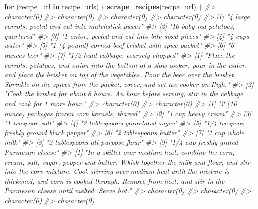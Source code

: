 \documentclass[
  12pt,
]{book}
\newenvironment{Shaded}{\begin{snugshade}}{\end{snugshade}}
\newcommand{\CommentTok}[1]{\textcolor[rgb]{0.37,0.37,0.37}{\textit{#1}}}
\newcommand{\ControlFlowTok}[1]{\textcolor[rgb]{0.27,0.27,0.27}{\textbf{#1}}}
\newcommand{\KeywordTok}[1]{\textcolor[rgb]{0.27,0.27,0.27}{\textbf{#1}}}
\newcommand{\NormalTok}[1]{#1}
\begin{document}
\begin{Shaded}
\begin{Highlighting}[]
\ControlFlowTok{for}\NormalTok{ (recipe\_url }\ControlFlowTok{in}\NormalTok{ recipe\_urls) \{}
  \KeywordTok{scrape\_recipes}\NormalTok{(recipe\_url)}
\NormalTok{\}}
\CommentTok{\#> character(0)}
\CommentTok{\#> character(0)}
\CommentTok{\#> character(0)}
\CommentTok{\#> character(0)}
\CommentTok{\#> [1] "4 large carrots, peeled and cut into matchstick pieces"}
\CommentTok{\#> [2] "10 baby red potatoes, quartered"                       }
\CommentTok{\#> [3] "1 onion, peeled and cut into bite{-}sized pieces"        }
\CommentTok{\#> [4] "4 cups water"                                          }
\CommentTok{\#> [5] "1 (4 pound) corned beef brisket with spice packet"     }
\CommentTok{\#> [6] "6 ounces beer"                                         }
\CommentTok{\#> [7] "1/2 head cabbage, coarsely chopped"                    }
\CommentTok{\#> [1] "Place the carrots, potatoes, and onion into the bottom of a slow cooker, pour in the water, and place the brisket on top of the vegetables. Pour the beer over the brisket. Sprinkle on the spices from the packet, cover, and set the cooker on High."}
\CommentTok{\#> [2] "Cook the brisket for about 8 hours. An hour before serving, stir in the cabbage and cook for 1 more hour."                                                                                                                                             }
\CommentTok{\#> character(0)}
\CommentTok{\#> character(0)}
\CommentTok{\#> [1] "2 (10 ounce) packages frozen corn kernels, thawed"}
\CommentTok{\#> [2] "1 cup heavy cream"                                }
\CommentTok{\#> [3] "1 teaspoon salt"                                  }
\CommentTok{\#> [4] "2 tablespoons granulated sugar"                   }
\CommentTok{\#> [5] "1/4 teaspoon freshly ground black pepper"         }
\CommentTok{\#> [6] "2 tablespoons butter"                             }
\CommentTok{\#> [7] "1 cup whole milk"                                 }
\CommentTok{\#> [8] "2 tablespoons all{-}purpose flour"                  }
\CommentTok{\#> [9] "1/4 cup freshly grated Parmesan cheese"           }
\CommentTok{\#> [1] "In a skillet over medium heat, combine the corn, cream, salt, sugar, pepper and butter. Whisk together the milk and flour, and stir into the corn mixture. Cook stirring over medium heat until the mixture is thickened, and corn is cooked through. Remove from heat, and stir in the Parmesan cheese until melted. Serve hot."}
\CommentTok{\#> character(0)}
\CommentTok{\#> character(0)}
\CommentTok{\#> character(0)}
\CommentTok{\#> character(0)}
\end{Highlighting}
\end{Shaded}
\end{document}

